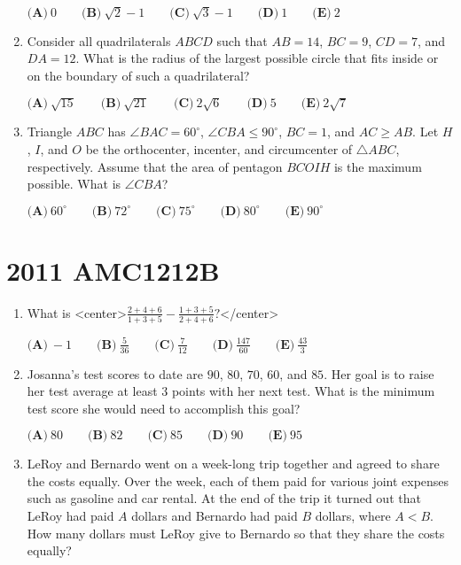 \documentclass{article}
\begin{document}
\begin{enumerate}[label=\arabic*., itemsep=0.5em]
$
\textbf{(A)}\ 0 \qquad
\textbf{(B)}\ \sqrt{2}-1 \qquad
\textbf{(C)}\ \sqrt{3}-1 \qquad
\textbf{(D)}\ 1 \qquad
\textbf{(E)}\ 2 $\par \vspace{0.5em}\item Consider all quadrilaterals $ABCD$ such that $AB=14$, $BC=9$, $CD=7$, and $DA=12$. What is the radius of the largest possible circle that fits inside or on the boundary of such a quadrilateral?

$
\textbf{(A)}\ \sqrt{15} \qquad
\textbf{(B)}\ \sqrt{21} \qquad
\textbf{(C)}\ 2\sqrt{6} \qquad
\textbf{(D)}\ 5 \qquad
\textbf{(E)}\ 2\sqrt{7} $\par \vspace{0.5em}\item Triangle $ABC$ has $\angle BAC = 60^{\circ}$, $\angle CBA \leq 90^{\circ}$, $BC=1$, and $AC \geq AB$. Let $H$, $I$, and $O$ be the orthocenter, incenter, and circumcenter of $\triangle ABC$, respectively. Assume that the area of pentagon $BCOIH$ is the maximum possible. What is $\angle CBA$?

$
\textbf{(A)}\ 60^{\circ} \qquad
\textbf{(B)}\ 72^{\circ} \qquad
\textbf{(C)}\ 75^{\circ} \qquad
\textbf{(D)}\ 80^{\circ} \qquad
\textbf{(E)}\ 90^{\circ} $\par \vspace{0.5em}\end{enumerate}\newpage\section*{2011 AMC1212B}\begin{enumerate}[label=\arabic*., itemsep=0.5em]\item What is <center>$ \frac{2+4+6}{1+3+5}-\frac{1+3+5}{2+4+6}? $</center>


$\textbf{(A)}\ -1 \qquad \textbf{(B)}\ \frac{5}{36} \qquad \textbf{(C)}\ \frac{7}{12} \qquad \textbf{(D)}\ \frac{147}{60} \qquad \textbf{(E)}\ \frac{43}{3}$\par \vspace{0.5em}\item Josanna's test scores to date are $90$, $80$, $70$, $60$, and $85$.  Her goal is to raise her test average at least $3$ points with her next test.  What is the minimum test score she would need to accomplish this goal?

$\textbf{(A)}\ 80 \qquad \textbf{(B)}\ 82 \qquad \textbf{(C)}\ 85 \qquad \textbf{(D)}\ 90 \qquad \textbf{(E)}\ 95$\par \vspace{0.5em}\item LeRoy and Bernardo went on a week-long trip together and agreed to share the costs equally.  Over the week, each of them paid for various joint expenses such as gasoline and car rental.  At the end of the trip it turned out that LeRoy had paid $A$ dollars and Bernardo had paid $B$ dollars, where $A<B$.  How many dollars must LeRoy give to Bernardo so that they share the costs equally?


\end{enumerate}
\end{document}
